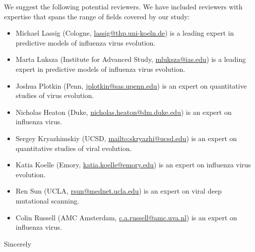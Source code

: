 \documentclass[a4paper,11pt]{letter}
\begin{document}
\begin{letter}{}
We suggest the following potential reviewers.
We have included reviewers with expertise that spans the range of fields covered by our study:
\begin{itemize}
\item Michael Lassig (Cologne, \href{mailto:lassig@thp.uni-koeln.de}{lassig@thp.uni-koeln.de}) is a leading expert in predictive models of influenza virus evolution.
\item Marta Luksza (Institute for Advanced Study, \href{mailto:mluksza@ias.edu}{mluksza@ias.edu}) is a leading expert in predictive models of influenza virus evolution.
\item Joshua Plotkin (Penn, \href{mailto:jplotkin@sas.upenn.edu}{jplotkin@sas.upenn.edu}) is an expert on quantitative studies of virus evolution.
\item Nicholas Heaton (Duke, \href{mailto:nicholas.heaton@dm.duke.edu}{nicholas.heaton@dm.duke.edu}) is an expert on influenza virus.
\item Sergey Kryazhimskiy (UCSD, \href{mailto:skryazhi@ucsd.edu}{mailto:skryazhi@ucsd.edu}) is an expert on quantitative studies of viral evolution.
\item Katia Koelle (Emory, \href{mailto:katia.koelle@emory.edu}{katia.koelle@emory.edu}) is an expert on influenza virus evolution.
\item Ren Sun (UCLA, \href{mailto:rsun@mednet.ucla.edu}{rsun@mednet.ucla.edu}) is an expert on viral deep mutational scanning.
\item Colin Russell (AMC Amsterdam, \href{mailto:c.a.russell@amc.uva.nl}{c.a.russell@amc.uva.nl}) is an expert on influenza virus.
\end{itemize}

\closing{Sincerely} %

\end{letter}
\end{document}
